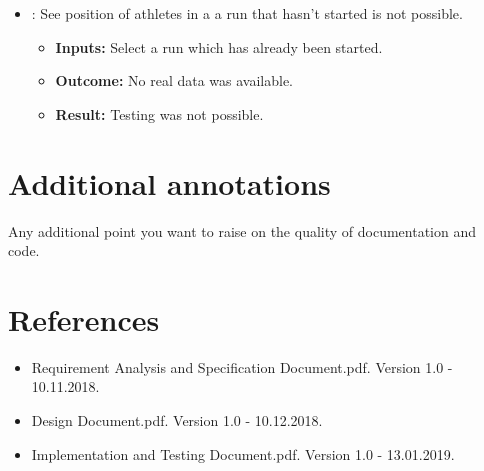 \documentclass[a4paper, hidelinks, 12pt]{report}
\newcommand\test[1]{\item[{[TEST-#1]}] }
\begin{document}
\begin{itemize}
\begin{itemize}
\test{23} : See position of athletes in a a run that hasn't started is not possible.
				\begin{itemize}
			\item \textbf{Inputs: } Select a run which has already been started.
			\item \textbf{Outcome: } No real data was available.
			\item \textbf{Result: } Testing was not possible. 
			\end{itemize}

	\end{itemize}
	\end{itemize}

	\chapter{Additional annotations}
	Any additional point you want to raise on the quality of documentation and code.

	\chapter{References}
	\begin{itemize}
		\item Requirement Analysis and Specification Document.pdf. Version 1.0 - 10.11.2018.
		\item Design Document.pdf. Version 1.0 - 10.12.2018.
		\item Implementation and Testing Document.pdf. Version 1.0 - 13.01.2019.
	\end{itemize}
\end{document}
